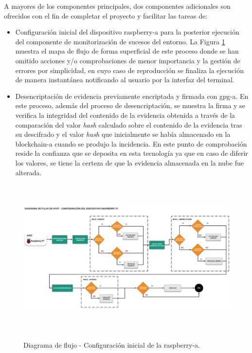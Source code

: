 \documentclass[12pt,a4paper, twoside]{report}
\begin{document}
	A mayores de los componentes principales, dos componentes adicionales son ofrecidos con el fin de completar el proyecto y facilitar las tareas de:

	\begin{itemize}
  		\item Configuración inicial del dispositivo \gls{raspberry-a} para la posterior ejecución del componente de monitorización de sucesos del entorno. La Figura \ref{fig:hyot_setupflow} muestra el mapa de flujo de forma superficial de este proceso donde se han omitido acciones y/o comprobaciones de menor importancia y la gestión de errores por simplicidad, en cuyo caso de reproducción se finaliza la ejecución de manera instantánea notificando al usuario por la interfaz del terminal.
  		
  		\item Desencriptación de evidencia previamente encriptada y firmada con \gls{gpg-a}. En este proceso, además del proceso de desencriptación, se muestra la firma y se verifica la integridad del contenido de la evidencia obtenida a través de la comparación del valor \textit{hash} calculado sobre el contenido de la evidencia tras su descifrado y el valor \textit{hash} que inicialmente se había almacenado en la \gls{blockchain-a} cuando se produjo la incidencia. En este punto de comprobación reside la confianza que se deposita en esta tecnología ya que en caso de diferir los valores, se tiene la certeza de que la evidencia almacenada en la nube fue alterada.
	\end{itemize}
	
	\begin{figure}[!ht]   
		\caption{Diagrama de flujo - Configuración inicial de la \gls{raspberry-a}.} 
		\begin{center} 
	 		\includegraphics[width=17cm,height=8cm]{Images/implement/hyot_setupflow} \\
			\label{fig:hyot_setupflow} 
		\end{center}  
	\end{figure}
		
\end{document}
